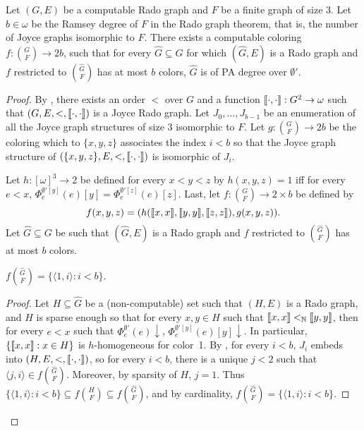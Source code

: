 \begin{theorem}\label{thm:weak-rado-triples-aca}
Let $(G, E)$ be a computable Rado graph and $F$ be a finite graph of size $3$. Let $b \in \omega$ be the Ramsey degree of $F$ in the Rado graph theorem, that is, the number of Joyce graphs isomorphic to $F$. There exists a computable coloring $f: {G \choose F} \to 2b$, such that for every $\hat{G} \subseteq G$ for which $(\hat{G}, E)$ is a Rado graph and $f$ restricted to ${\hat{G} \choose F}$ has at most $b$ colors, $\hat{G}$ is of PA degree over $\emptyset'$.
\end{theorem}
\begin{proof}
By , there exists an order $<$ over $G$ and a function $\llbracket \cdot , \cdot \rrbracket: G^2 \to \omega$ such that $(G, E, <, \llbracket \cdot , \cdot \rrbracket)$ is a Joyce Rado graph. Let $J_0, \dots, J_{b-1}$ be an enumeration of all the Joyce graph structures of size 3 isomorphic to $F$. Let $g: {G \choose F} \to 2b$ be the coloring which to $\{x, y, z\}$ associates the index $i < b$ so that the Joyce graph structure of $(\{x, y, z\}, E, <, \llbracket \cdot , \cdot \rrbracket)$ is isomorphic of $J_i$.

Let $h: [\omega]^3 \to 2$ be defined for every $x < y < z$ by $h(x, y, z) = 1$ iff for every $e < x$, $\Phi_e^{\emptyset'[y]}(e)[y] = \Phi_e^{\emptyset'[z]}(e)[z]$. Last, let $f: {G \choose F} \to 2 \times b$ be defined by 
$$
f(x, y, z) = ( h(\llbracket x , x \rrbracket, \llbracket y , y \rrbracket, \llbracket z , z \rrbracket), g(x, y, z) ).
$$
Let $\hat{G} \subseteq G$ be such that $(\hat{G}, E)$ is a Rado graph and $f$ restricted to ${\hat{G} \choose F}$ has at most $b$ colors.


\begin{claim}\label{claim:weak-rado-triples-aca-1}
$f{\hat{G} \choose F} = \{\langle 1, i\rangle: i < b\}$.
\end{claim}
\begin{proof}
Let $H \subseteq \hat{G}$ be a (non-computable) set such that $(H, E)$ is a Rado graph, and $H$ is sparse enough so that for every $x, y \in H$ such that $\llbracket x , x \rrbracket <_{\mathbb{N}} \llbracket y , y \rrbracket$, then for every $e < x$ such that $\Phi_e^{\emptyset'}(e)\downarrow$,  $\Phi_e^{\emptyset'[y]}(e)[y]\downarrow$. In particular, $\{ \llbracket x , x \rrbracket: x \in H \}$ is $h$-homogeneous for color~1.
By , for every $i < b$, $J_i$ embeds into $(H, E, <, \llbracket \cdot , \cdot \rrbracket)$, so for every $i < b$, there is a unique $j < 2$ such that $\langle j, i\rangle \in f{\hat{G} \choose F}$. Moreover, by sparsity of $H$, $j = 1$. Thus $\{\langle 1, i\rangle: i < b\} \subseteq f{H \choose F} \subseteq f{\hat{G} \choose F}$, and by cardinality, $f{\hat{G} \choose F} = \{\langle 1, i\rangle: i < b\}$.
\end{proof}


\end{proof}

